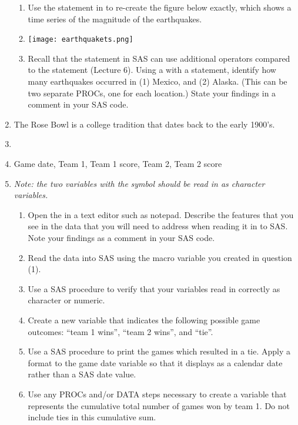 \begin{enumerate}
\begin{enumerate}
\item Use the  statement in  to re-create the figure below exactly, which shows a time series of the magnitude of the earthquakes.
\item[] \texttt{[image: earthquakets.png]}
\item Recall that the  statement in SAS can use additional operators compared to the  statement (Lecture 6).  Using a  with a  statement, identify how many earthquakes occurred in (1) Mexico, and (2) Alaska.  (This can be two separate PROCs, one for each location.)  State your findings in a comment in your SAS code.
\end{enumerate}
\item The Rose Bowl is a college tradition that dates back to the early 1900's.
\item[]
\underline{}
\item[]  Game date,  Team 1, Team 1 score,  Team 2, Team 2 score
\item[] \emph{Note: the two variables with the}  \emph{symbol should be read in as character variables.}
\begin{enumerate}
\item Open the  in a text editor such as notepad.  Describe the features that you see in the data that you will need to address when reading it in to SAS.  Note your findings as a comment in your SAS code.
\item Read the data into SAS using the macro variable you created in question (1).
\item Use a SAS procedure to verify that your variables read in correctly as character or numeric.
\item Create a new variable that indicates the following possible game outcomes: ``team 1 wins'', ``team 2 wins'', and ``tie''.
\item Use a SAS procedure to print the games which resulted in a tie.  Apply a format to the game date variable so that it displays as a calendar date rather than a SAS date value.
\item Use any PROCs and/or DATA steps necessary to create a variable that represents the cumulative total number of games won by team 1.  Do not include ties in this cumulative sum.

\end{enumerate}
\end{enumerate}
